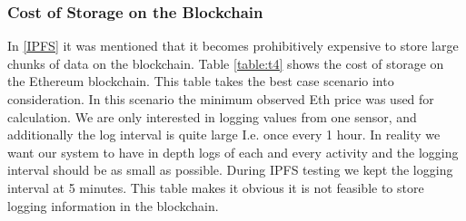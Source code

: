 \subsubsection{Cost of Storage on the Blockchain}
In \ref{IPFS} it was mentioned that it becomes prohibitively expensive to store large chunks of data on the blockchain. Table \ref{table:t4} shows the cost of storage on the Ethereum blockchain. This table takes the best case scenario into consideration. In this scenario the minimum observed Eth price was used for calculation. We are only interested in logging values from one sensor, and additionally the log interval is quite large I.e. once every 1 hour. In reality we want our system to have in depth logs of each and every activity and the logging interval should be as small as possible. During IPFS testing we kept the logging interval at 5 minutes. This table makes it obvious it is not feasible to store logging information in the blockchain. 
